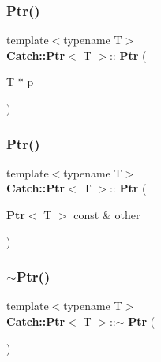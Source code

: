 \mbox{\label{class_catch_1_1_ptr_aacec063a79cd142e39040a31c6b3c40b}} 
\subsubsection{Ptr()\hspace{0.1cm}{\footnotesize\ttfamily [2/3]}}
{\footnotesize\ttfamily template$<$typename T$>$ \\
\textbf{ Catch\+::\+Ptr}$<$ T $>$\+::\textbf{ Ptr} (\begin{DoxyParamCaption}\item[{T $\ast$}]{p }\end{DoxyParamCaption})\hspace{0.3cm}{\ttfamily [inline]}}

\mbox{\label{class_catch_1_1_ptr_ac629dd8ebe5763a37bb89e6c1d6a1771}} 
\subsubsection{Ptr()\hspace{0.1cm}{\footnotesize\ttfamily [3/3]}}
{\footnotesize\ttfamily template$<$typename T$>$ \\
\textbf{ Catch\+::\+Ptr}$<$ T $>$\+::\textbf{ Ptr} (\begin{DoxyParamCaption}\item[{\textbf{ Ptr}$<$ T $>$ const \&}]{other }\end{DoxyParamCaption})\hspace{0.3cm}{\ttfamily [inline]}}

\mbox{\label{class_catch_1_1_ptr_ac96d3bb33adcfb983207385cfba5fe8a}} 
\subsubsection{$\sim$\+Ptr()}
{\footnotesize\ttfamily template$<$typename T$>$ \\
\textbf{ Catch\+::\+Ptr}$<$ T $>$\+::$\sim$\textbf{ Ptr} (\begin{DoxyParamCaption}{ }\end{DoxyParamCaption})\hspace{0.3cm}{\ttfamily [inline]}}



